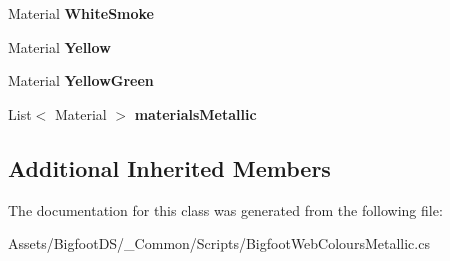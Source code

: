 \begin{DoxyCompactItemize}
Material {\bfseries White\+Smoke}
\item 
\mbox{\label{class_bigfoot_d_s_1_1_bigfoot_web_colours_metallic_a09758b30be08785345d2c20e5d0977c4}} 
Material {\bfseries Yellow}
\item 
\mbox{\label{class_bigfoot_d_s_1_1_bigfoot_web_colours_metallic_ad44e55bf124afcfcdf103424e998309d}} 
Material {\bfseries Yellow\+Green}
\item 
\mbox{\label{class_bigfoot_d_s_1_1_bigfoot_web_colours_metallic_a525b7e0aafd971fe1246621602df73eb}} 
List$<$ Material $>$ {\bfseries materials\+Metallic}
\end{DoxyCompactItemize}
\subsection*{Additional Inherited Members}


The documentation for this class was generated from the following file\+:\begin{DoxyCompactItemize}
\item 
Assets/\+Bigfoot\+D\+S/\+\_\+\+Common/\+Scripts/Bigfoot\+Web\+Colours\+Metallic.\+cs\end{DoxyCompactItemize}
